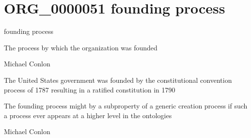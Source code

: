 \documentclass[letterpaper,10pt,english]{sphinxmanual}
\begin{document}
\section{ORG\_0000051 \sphinxhyphen{} founding process}
\label{\detokenize{doc-ORG_0000051:org-0000051-founding-process}}\label{\detokenize{doc-ORG_0000051:index-0}}\label{\detokenize{doc-ORG_0000051::doc}}
\begin{sphinxShadowBox}

\sphinxAtStartPar
founding process
\end{sphinxShadowBox}

\begin{sphinxShadowBox}

\sphinxAtStartPar
The process by which the organization was founded
\end{sphinxShadowBox}

\begin{sphinxShadowBox}

\sphinxAtStartPar
Michael Conlon 
\end{sphinxShadowBox}

\begin{sphinxShadowBox}

\sphinxAtStartPar
The United States government was founded by the constitutional convention process of 1787 resulting in a ratified constitution in 1790
\end{sphinxShadowBox}

\begin{sphinxShadowBox}

\sphinxAtStartPar
The founding process might by a subproperty of a generic creation process if such a process ever appears at a higher level in the ontologies
\end{sphinxShadowBox}

\begin{sphinxShadowBox}

\sphinxAtStartPar
Michael Conlon 
\end{sphinxShadowBox}
\begin{quote}
\label{\detokenize{doc-ORG_0000052:org-0000052}}\label{\detokenize{doc-ORG_0000052:founding-process-boundary}}\label{\detokenize{doc-ORG_0000052:org-0000052}}
\ignorespaces \end{quote}
\end{document}
